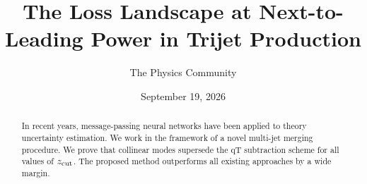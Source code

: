 \documentclass[11pt]{article}
\title{The Loss Landscape at Next-to-Leading Power in Trijet Production}
\author{The Physics Community}
\date{September 19, 2026}
\numberwithin{equation}{section}
\theoremstyle{definition}
\theoremstyle{remark}
\begin{document}
\maketitle
\begin{abstract}
In recent years, message-passing neural networks have been applied to
theory uncertainty estimation. We work in the framework of a novel
multi-jet merging procedure. We prove that collinear modes supersede the
qT subtraction scheme for all values of $z_{\rm cut}$. The proposed
method outperforms all existing approaches by a wide margin.
\end{abstract}
\tableofcontents




\nocite{*}


\end{document}
